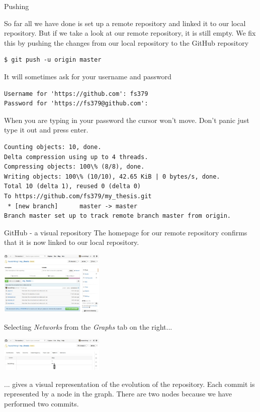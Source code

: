 \documentclass[10pt]{beamer}
\begin{document}
\begin{frame}[fragile]{Pushing}

So far all we have done is set up a remote repository and linked it to our local repository. But if we take a look at our remote repository, it is still empty. We fix this by pushing the changes from our local repository to the GitHub repository
\begin{lstlisting}
$ git push -u origin master
\end{lstlisting}
It will sometimes ask for your username and password
\begin{lstlisting}[frame=single]
Username for 'https://github.com': fs379
Password for 'https://fs379@github.com':
\end{lstlisting}
When you are typing in your password the cursor won't move. Don't panic just type it out and press enter.
\begin{lstlisting}[frame=single]
Counting objects: 10, done.
Delta compression using up to 4 threads.
Compressing objects: 100\% (8/8), done.
Writing objects: 100\% (10/10), 42.65 KiB | 0 bytes/s, done.
Total 10 (delta 1), reused 0 (delta 0)
To https://github.com/fs379/my_thesis.git
 * [new branch]      master -> master
Branch master set up to track remote branch master from origin.
\end{lstlisting}

\end{frame}





\begin{frame}[fragile]{GitHub - a visual repository}
The homepage for our remote repository confirms that it is now linked to our local repository.
\begin{center}
\includegraphics[width=5cm]{./auxfiles/Ghub3.jpg}
\end{center}
Selecting \emph{Networks} from the \emph{Graphs} tab on the right...

\begin{center}
\includegraphics[width=5cm]{./auxfiles/Network.jpg}
\end{center}
... gives a visual representation of the evolution of the repository. Each commit is represented by a node in the graph. There are two nodes because we have performed two commits.




\end{frame}
\end{document}
